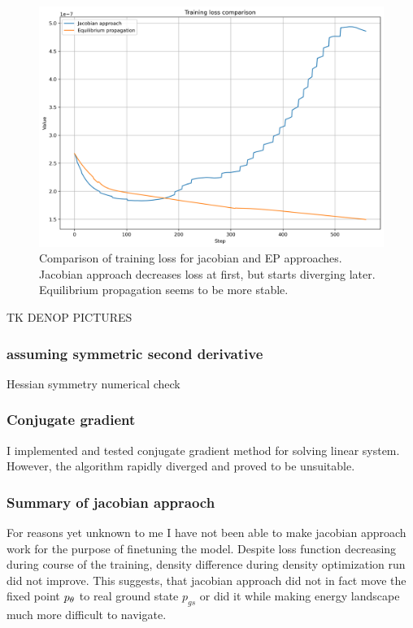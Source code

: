 \documentclass[a4paper,10pt]{report}
\begin{document}
\begin{figure}[h!]
 \centering
 \includegraphics[scale=0.5]{images/loss_comparison.png}
 \caption{Comparison of training loss for jacobian and EP approaches. Jacobian approach decreases loss at first, but starts diverging later. Equilibrium propagation seems to be more stable.}
 \label{fig:jac-eqprop-loss}
\end{figure}



TK DENOP PICTURES
\subsubsection{assuming symmetric second derivative}

Hessian symmetry numerical check

\subsubsection{Conjugate gradient}
I implemented and tested conjugate gradient method for solving linear system. However, the algorithm rapidly diverged and proved to be unsuitable.
\subsubsection{Summary of jacobian appraoch}

 For reasons yet unknown to me I have not been able to make jacobian approach work for the purpose of finetuning the model. Despite loss function decreasing during course of the training, density difference during density optimization run did not improve. This suggests, that jacobian approach did not in fact move the fixed point $p_\theta$ to real ground state $p_{gs}$ or did it while making energy landscape much more difficult to navigate.
\end{document}
